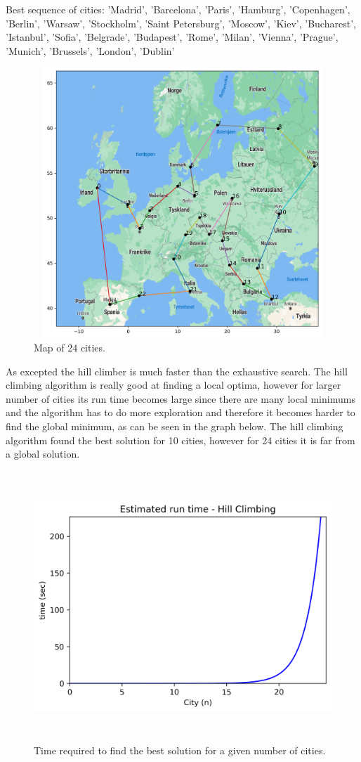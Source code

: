 \documentclass[a4paper,12pt]{article}
\begin{document}
Best sequence of cities: 'Madrid', 'Barcelona', 'Paris', 'Hamburg', 'Copenhagen', 'Berlin', 'Warsaw', 'Stockholm', 'Saint Petersburg', 'Moscow', 'Kiev', 'Bucharest', 'Istanbul', 'Sofia', 'Belgrade', 'Budapest', 'Rome', 'Milan', 'Vienna', 'Prague', 'Munich', 'Brussels', 'London', 'Dublin' \\ 

\begin{figure}[H]
\centerline{\includegraphics[width=6in, height=4in]{Hillclimber1.png}}
\caption{Map of 24 cities.}
\label{fig}
\end{figure}

As excepted the hill climber is much faster than the exhaustive search. The hill climbing algorithm is really good at finding a local optima, however for larger number of cities its run time becomes large since there are many local minimums and the algorithm has to do more exploration and therefore it becomes harder to find the global minimum, as can be seen in the graph below. The hill climbing algorithm found the best solution for 10 cities, however for 24 cities it is far from a global solution.

\begin{figure}[H]
\centerline{\includegraphics[width=6in, height=4in]{HillClimber-fit.png}}
\caption{Time required to find the best solution for a given number of cities.}
\label{fig}
\end{figure}
\end{document}

